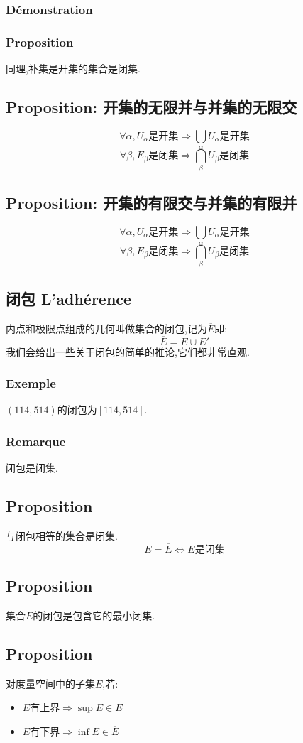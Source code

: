 \documentclass[12pt, a4paper, oneside]{ctexbook}
\begin{document}
  \subsubsection{Démonstration}
  \subsubsection{Proposition}
  同理,补集是开集的集合是闭集.
  \subsection{Proposition: 开集的无限并与并集的无限交}
  $$
  \forall \alpha ,U_\alpha\text{是开集}\Rightarrow\bigcup_\alpha U_\alpha\text{是开集}
  $$
  $$
  \forall \beta ,E_\beta\text{是闭集}\Rightarrow\bigcap_\beta U_\beta\text{是闭集}
  $$
  \subsection{Proposition: 开集的有限交与并集的有限并}
  $$
  \forall \alpha ,U_\alpha\text{是开集}\Rightarrow\bigcup_\alpha U_\alpha\text{是开集}
  $$
  $$
  \forall \beta ,E_\beta\text{是闭集}\Rightarrow\bigcap_\beta U_\beta\text{是闭集}
  $$

  \subsection{闭包 L'adhérence}
  内点和极限点组成的几何叫做集合的闭包,记为$\overline{E}$即:
  $$
  \overline{E}=E\cup E'
  $$
  我们会给出一些关于闭包的简单的推论,它们都非常直观.
  \subsubsection{Exemple}
  $(114,514)$的闭包为$[114,514]$.
  \subsubsection{Remarque}
  闭包是闭集.
  \subsection{Proposition}
  与闭包相等的集合是闭集.
  $$
  E=\overline{E}\Leftrightarrow E\text{是闭集}
  $$
  \subsection{Proposition}
  集合$E$的闭包是包含它的最小闭集.
  \subsection{Proposition}
  对度量空间中的子集$E$,若:
  \begin{itemize}
    \item $E$有上界$\Rightarrow \sup E\in \overline{E}$
    \item $E$有下界$\Rightarrow \inf E\in \overline{E}$
  \end{itemize}
\end{document}
